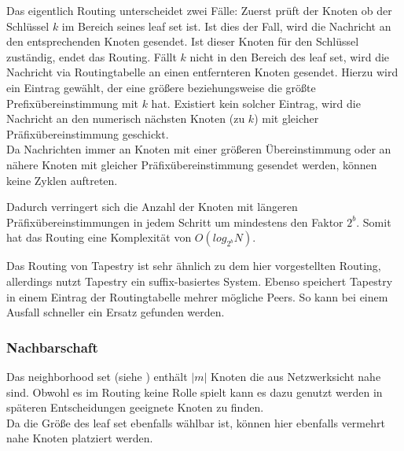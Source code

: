 Das eigentlich Routing unterscheidet zwei Fälle: Zuerst prüft der Knoten ob der Schlüssel $k$ im Bereich seines leaf set ist. Ist dies der Fall, wird die Nachricht an den entsprechenden Knoten gesendet. Ist dieser Knoten für den Schlüssel zuständig, endet das Routing. Fällt $k$ nicht in den Bereich des leaf set, wird die Nachricht via Routingtabelle an einen entfernteren Knoten gesendet. Hierzu wird ein Eintrag gewählt, der eine größere beziehungsweise die größte Prefixübereinstimmung mit $k$ hat. Existiert kein solcher Eintrag, wird die Nachricht an den numerisch nächsten Knoten (zu $k$) mit gleicher Präfixübereinstimmung geschickt.\\
Da Nachrichten immer an Knoten mit einer größeren Übereinstimmung oder an nähere Knoten mit gleicher Präfixübereinstimmung gesendet werden, können keine Zyklen auftreten.

Dadurch verringert sich die Anzahl der Knoten mit längeren Präfixübereinstimmungen in jedem Schritt um mindestens den Faktor $2^b$. Somit hat das Routing eine Komplexität von $O(log_{2^b} N)$.

Das Routing von Tapestry ist sehr ähnlich zu dem hier vorgestellten Routing, allerdings nutzt Tapestry ein suffix-basiertes System. Ebenso speichert Tapestry in einem Eintrag der Routingtabelle mehrer mögliche Peers. So kann bei einem Ausfall schneller ein Ersatz gefunden werden.

\subsubsection*{Nachbarschaft}
Das neighborhood set (siehe ) enthält $|m|$ Knoten die aus Netzwerksicht nahe sind. Obwohl es im Routing keine Rolle spielt kann es dazu genutzt werden in späteren Entscheidungen geeignete Knoten zu finden.\\
Da die Größe des leaf set ebenfalls wählbar ist, können hier ebenfalls vermehrt nahe Knoten platziert werden.

